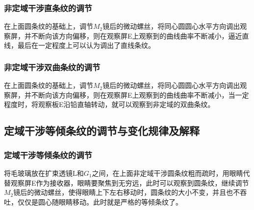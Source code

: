 \documentclass[a4paper,11pt]{article}
\begin{document}
\subsubsection{非定域干涉直条纹的调节}
在上面圆条纹的基础上，调节$M_{2}$镜后的微动螺丝，将同心圆圆心水平方向调出观察屏，并不断向该方向偏移，则在观察屏E上观察到的曲线曲率不断减小，逼近直线，最后在一定程度上可以认为调出了直线条纹。
\subsubsection{非定域干涉双曲条纹的调节}
在上面圆条纹的基础上，调节$M_{2}$镜后的微动螺丝，将同心圆圆心水平方向调出观察屏，并不断向该方向偏移，则在观察屏E上观察到的曲线曲率不断减小，当一定程度时，将观察板E沿铅直轴转动，就可以观察到非定域的双曲条纹。
	
\subsection{定域干涉等倾条纹的调节与变化规律及解释}
\subsubsection{定域干涉等倾条纹的调节}
将毛玻璃放在扩束透镜L和$ G_{1} $之间，在上面非定域干涉圆条纹粗而疏时，用眼睛代替观察屏E作为接收器，眼睛要聚焦到无穷远，此时可以观察到圆条纹，继续调节$M_{2}$镜后的微动螺丝，使得眼睛上下左右移动时，圆条纹的大小不变，并且也不吞吐，仅仅是圆心随眼睛移动。此时就是严格的等倾条纹了。
\end{document}
